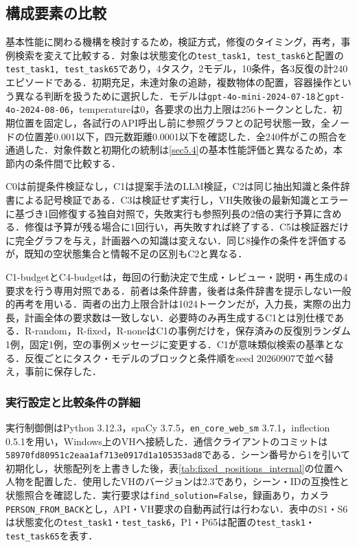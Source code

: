 \subsection{構成要素の比較}\label{sec5.additional}

基本性能に関わる機構を検討するため，検証方式，修復のタイミング，再考，事例検索を変えて比較する．対象は状態変化の\texttt{test\_task1, test\_task6}と配置の\texttt{test\_task1, test\_task65}であり，4タスク，2モデル，10条件，各3反復の計240エピソードである．初期充足，未達対象の追跡，複数物体の配置，容器操作という異なる判断を扱うために選択した．モデルは\texttt{gpt-4o-mini-2024-07-18}と\texttt{gpt-4o-2024-08-06}，temperatureは0，各要求の出力上限は256トークンとした．初期位置を固定し，各試行のAPI呼出し前に参照グラフとの記号状態一致，全ノードの位置差0.001以下，四元数距離0.0001以下を確認した．全240件がこの照合を通過した．対象件数と初期化の統制は\ref{sec5.4}の基本性能評価と異なるため，本節内の条件間で比較する．

C0は前提条件検証なし，C1は提案手法のLLM検証，C2は同じ抽出知識と条件辞書による記号検証である．C3は検証せず実行し，VH失敗後の最新知識とエラーに基づき1回修復する独自対照で，失敗実行も参照列長の2倍の実行予算に含める．修復は予算が残る場合に1回行い，再失敗すれば終了する．C5は検証器だけに完全グラフを与え，計画器への知識は変えない．同じ8操作の条件を評価するが，既知の空状態集合と情報不足の区別もC2と異なる．

C1-budgetとC4-budgetは，毎回の行動決定で生成・レビュー・説明・再生成の4要求を行う専用対照である．前者は条件辞書，後者は条件辞書を提示しない一般的再考を用いる．両者の出力上限合計は1024トークンだが，入力長，実際の出力長，計画全体の要求数は一致しない．必要時のみ再生成するC1とは別仕様である．R-random，R-fixed，R-noneはC1の事例だけを，保存済みの反復別ランダム1例，固定1例，空の事例メッセージに変更する．C1が意味類似検索の基準となる．反復ごとにタスク・モデルのブロックと条件順をseed 20260907で並べ替え，事前に保存した．


\subsubsection{実行設定と比較条件の詳細}\label{sec5.control_settings}
実行制御側はPython 3.12.3，spaCy 3.7.5，\texttt{en\_core\_web\_sm} 3.7.1，inflection 0.5.1を用い，Windows上のVHへ接続した．通信クライアントのコミットは\texttt{58970fd80951c2eaa1af713e0917d1a105353ad8}である．シーン番号から1を引いて初期化し，状態配列を上書きした後，表\ref{tab:fixed_positions_internal}の位置へ人物を配置した．使用したVHのバージョンは2.3であり，シーン・IDの互換性と状態照合を確認した．実行要求は\texttt{find\_solution=False}，録画あり，カメラ\texttt{PERSON\_FROM\_BACK}とし，API・VH要求の自動再試行は行わない．表中のS1・S6は状態変化の\texttt{test\_task1}・\texttt{test\_task6}，P1・P65は配置の\texttt{test\_task1}・\texttt{test\_task65}を表す．

